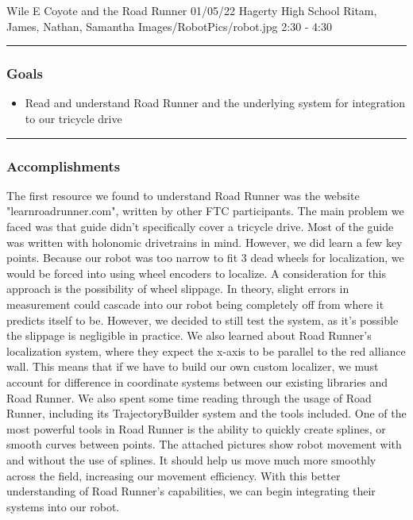 \insertmeeting 
	{Wile E Coyote and the Road Runner} 
	{01/05/22} 
	{Hagerty High School}
	{Ritam, James, Nathan, Samantha}
	{Images/RobotPics/robot.jpg}
	{2:30 - 4:30}
	
\noindent\hfil\rule{\textwidth}{.4pt}\hfil
\subsubsection*{Goals}
\begin{itemize}
    \item Read and understand Road Runner and the underlying system for integration to our tricycle drive 

\end{itemize} 

\noindent\hfil\rule{\textwidth}{.4pt}\hfil

\subsubsection*{Accomplishments}
The first resource we found to understand Road Runner was the website "learnroadrunner.com", written by other FTC participants. The main problem we faced was that guide didn't specifically cover a tricycle drive. Most of the guide was written with holonomic drivetrains in mind. However, we did learn a few key points. Because our robot was too narrow to fit 3 dead wheels for localization, we would be forced into using wheel encoders to localize. A consideration for this approach is the possibility of wheel slippage. In theory, slight errors in measurement could cascade into our robot being completely off from where it predicts itself to be. However, we decided to still test the system, as it's possible the slippage is negligible in practice. We also learned about Road Runner's localization system, where they expect the x-axis to be parallel to the red alliance wall. This means that if we have to build our own custom localizer, we must account for difference in coordinate systems between our existing libraries and Road Runner. We also spent some time reading through the usage of Road Runner, including its TrajectoryBuilder system and the tools included. One of the most powerful tools in Road Runner is the ability to quickly create splines, or smooth curves between points. The attached pictures show robot movement with and without the use of splines. It should help us move much more smoothly across the field, increasing our movement efficiency. With this better understanding of Road Runner's capabilities, we can begin integrating their systems into our robot. 
 

